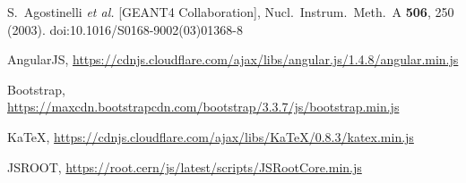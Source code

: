 \begin{thebibliography}{}
%
%
S.~Agostinelli {\it et al.} [GEANT4 Collaboration],
  Nucl.\ Instrum.\ Meth.\ A {\bf 506}, 250 (2003).
  doi:10.1016/S0168-9002(03)01368-8

AngularJS, \url{https://cdnjs.cloudflare.com/ajax/libs/angular.js/1.4.8/angular.min.js}

Bootstrap, \url{https://maxcdn.bootstrapcdn.com/bootstrap/3.3.7/js/bootstrap.min.js}

KaTeX, \url{https://cdnjs.cloudflare.com/ajax/libs/KaTeX/0.8.3/katex.min.js}

JSROOT, \url{https://root.cern/js/latest/scripts/JSRootCore.min.js}

\end{thebibliography}